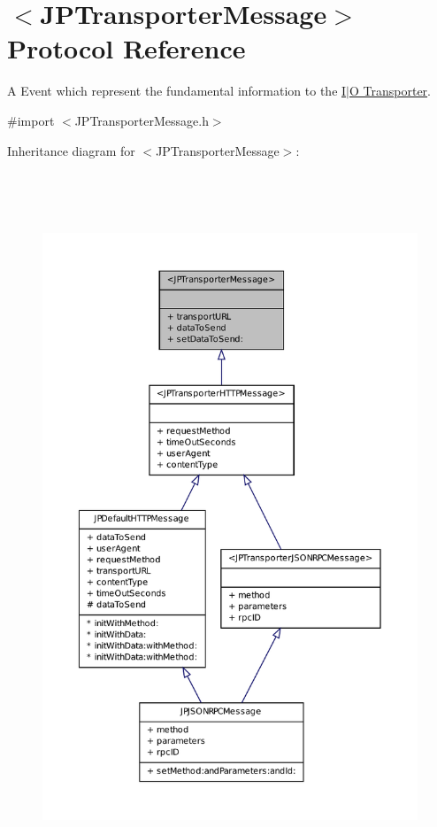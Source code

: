 \hypertarget{a00042}{
\section{$<$JPTransporterMessage$>$ Protocol Reference}
\label{a00042}
}


A Event which represent the fundamental information to the \hyperlink{a00002}{I$|$O Transporter}.  




{\ttfamily \#import $<$JPTransporterMessage.h$>$}



Inheritance diagram for $<$JPTransporterMessage$>$:
\nopagebreak
\begin{figure}[H]
\begin{center}
\leavevmode
\includegraphics[height=600pt]{a00173}
\end{center}
\end{figure}
